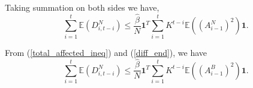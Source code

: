 \documentclass{article}
\theoremstyle{definition}
\newcommand{\lrp}[1]{\left({#1}\right)}
\newcommand{\abs}[1]{\left\lvert{#1}\right\rvert}
\newcommand{\Exp}[1]{\mathbb{E}\lrp{#1}}
\begin{document}
Taking summation on both sides we have,
 \begin{equation}\sum_{i=1}^t \Exp{D_{i,t-i}^N} \le \frac{\hat{\beta}}{N} \bm{1}^T \sum_{i=1}^{t} {K}^{t-i} \Exp{(A_{i-1}^N)^2 }\bm{1}. 
 \label{diff_end}
 \end{equation}


From (\ref{total_affected_ineq}) and (\ref{diff_end}), we have
 \begin{equation*}\sum_{i=1}^t \Exp{D_{i,t-i}^N} \le \frac{\hat{\beta}}{N} \bm{1}^T \sum_{i=1}^{t} {K}^{t-i} \Exp{(A_{i-1}^B)^2 }\bm{1}. 
 \end{equation*}



 
 
 
   
 




\end{document}
